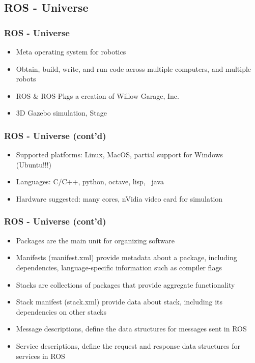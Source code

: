 \subsection{ROS - Universe}

\begin{frame}
  \frametitle{ROS - Universe}

\begin{itemize}
 \item Meta operating system for robotics
 \item Obtain, build, write, and run code across multiple computers, and multiple robots
 \item ROS \& ROS-Pkgs a creation of Willow Garage, Inc.
 \item 3D Gazebo simulation, Stage   
\end{itemize} 
\end{frame}

\begin{frame}
  \frametitle{ROS - Universe (cont'd)}

\begin{itemize}
 \item Supported platforms: Linux, MacOS, partial support for Windows (Ubuntu!!!)
 \item Languages: C/C++, python, octave, lisp, ~java
 \item Hardware suggested: many cores, nVidia video card for simulation
\end{itemize} 
\end{frame}

\begin{frame}
  \frametitle{ROS - Universe (cont'd)}

\begin{itemize}
 \item Packages are the main unit for organizing software
 \item Manifests (manifest.xml) provide metadata about a package, including dependencies, language-specific information such as compiler flags
 \item Stacks are collections of packages that provide aggregate functionality
 \item Stack manifest (stack.xml) provide data about stack, including its dependencies on other stacks
 \item Message descriptions, define the data structures for messages sent in ROS
 \item Service descriptions, define the request and response data structures for services in ROS
\end{itemize} 
\end{frame}

